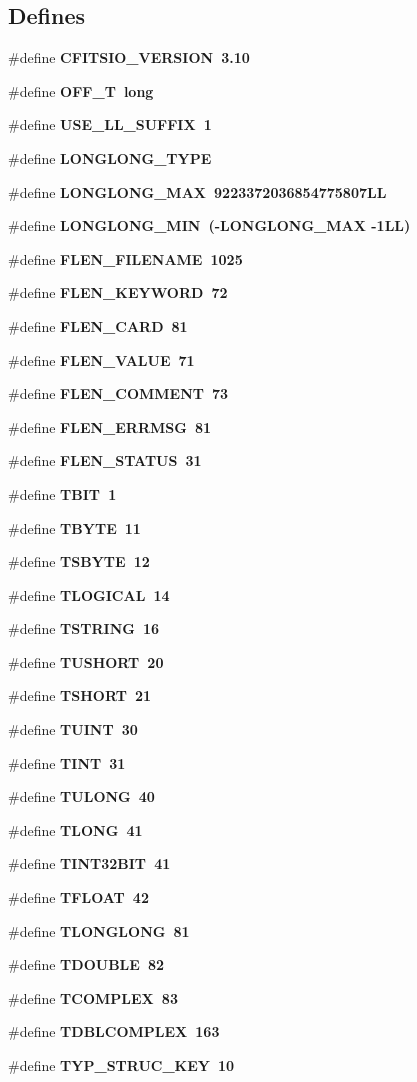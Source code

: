 \subsection*{Defines}
\begin{CompactItemize}
\item 
\#define \bf{CFITSIO\_\-VERSION}~3.10
\item 
\#define \bf{OFF\_\-T}~long
\item 
\#define \bf{USE\_\-LL\_\-SUFFIX}~1
\item 
\#define \bf{LONGLONG\_\-TYPE}
\item 
\#define \bf{LONGLONG\_\-MAX}~9223372036854775807LL
\item 
\#define \bf{LONGLONG\_\-MIN}~(-LONGLONG\_\-MAX -1LL)
\item 
\#define \bf{FLEN\_\-FILENAME}~1025
\item 
\#define \bf{FLEN\_\-KEYWORD}~72
\item 
\#define \bf{FLEN\_\-CARD}~81
\item 
\#define \bf{FLEN\_\-VALUE}~71
\item 
\#define \bf{FLEN\_\-COMMENT}~73
\item 
\#define \bf{FLEN\_\-ERRMSG}~81
\item 
\#define \bf{FLEN\_\-STATUS}~31
\item 
\#define \bf{TBIT}~1
\item 
\#define \bf{TBYTE}~11
\item 
\#define \bf{TSBYTE}~12
\item 
\#define \bf{TLOGICAL}~14
\item 
\#define \bf{TSTRING}~16
\item 
\#define \bf{TUSHORT}~20
\item 
\#define \bf{TSHORT}~21
\item 
\#define \bf{TUINT}~30
\item 
\#define \bf{TINT}~31
\item 
\#define \bf{TULONG}~40
\item 
\#define \bf{TLONG}~41
\item 
\#define \bf{TINT32BIT}~41
\item 
\#define \bf{TFLOAT}~42
\item 
\#define \bf{TLONGLONG}~81
\item 
\#define \bf{TDOUBLE}~82
\item 
\#define \bf{TCOMPLEX}~83
\item 
\#define \bf{TDBLCOMPLEX}~163
\item 
\#define \bf{TYP\_\-STRUC\_\-KEY}~10

\end{CompactItemize}
